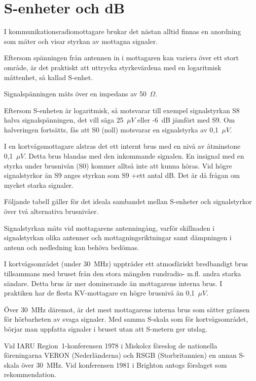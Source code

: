 \chapter{S-enheter och dB}
\label{s-enhet}

I kommunikationsradiomottagare brukar det nästan alltid finnas en
anordning som mäter och visar styrkan av mottagna signaler.

Eftersom spänningen från antennen in i mottagaren kan variera över ett stort
område, är det praktiskt att uttrycka styrkevärdena med en logaritmisk
måttenhet, så kallad S-enhet.

Signalspänningen mäts över en impedans av 50~\(\Omega\).

Eftersom S-enheten är logaritmisk, så motsvarar till exempel signalstyrkan S8
halva signalspänningen, det vill säga 25~\(\mu V\) eller -6~dB jämfört med S9.
Om halveringen fortsätts, fås att S0 (noll) motsvarar en signalstyrka av 0,1~\(\mu V\).

I en kortvågsmottagare alstras det ett internt brus med en nivå av
åtminstone 0,1~\(\mu V\).
Detta brus blandas med den inkommande signalen.
En insignal med en styrka under brusnivån (S0) kommer alltså inte att
kunna höras.
Vid högre signalstyrkor än S9 anges styrkan som S9 +ett antal dB.
Det är då frågan om mycket starka signaler.

Följande tabell gäller för det ideala sambandet mellan S-enheter och
signalstyrkor över två alternativa brusnivåer.

Signalstyrkan mäts vid mottagarens antenningång, varför skillnaden i
signalstyrkan olika antenner och mottagningsriktningar samt dämpningen
i antenn och nedledning kan behöva bedömas.

I kortvågsområdet (under 30~MHz) uppträder ett atmosfäriskt bredbandigt brus
tillsammans med bruset från den stora mängden rundradio- m.fl. andra starka
sändare.
Detta brus är mer dominerande än mottagarens interna brus.
I praktiken har de flesta KV-mottagare en högre brusnivå än 0,1~\(\mu V\).

Över 30~MHz däremot, är det mest mottagarens interna brus som sätter
gränsen för hörbarheten av svaga signaler.
Med samma S-skala som för kortvågsområdet, börjar man uppfatta signaler i
bruset utan att S-metern ger utslag.

Vid IARU Region~1-konferensen 1978 i Miskolcz föreslog de nationella
föreningarna VERON (Nederländerna) och RSGB (Storbritannien) en annan
S-skala över 30~MHz.
Vid konferensen 1981 i Brighton antogs förslaget som rekommendation.


